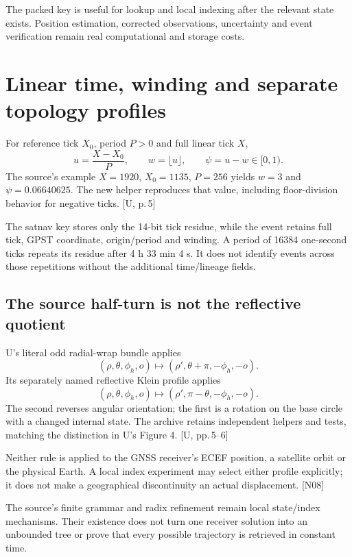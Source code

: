 \documentclass[11pt,a4paper]{article}
\newcommand{\src}[1]{\textcolor{muted}{[U, #1]}}
\newcommand{\dec}[1]{\textcolor{accent}{[N#1]}}
\begin{document}
The packed key is useful for lookup and local indexing after the relevant state exists.
Position estimation, corrected observations, uncertainty and event verification remain
real computational and storage costs.
\clearpage

\section{Linear time, winding and separate topology profiles}
For reference tick $X_0$, period $P>0$ and full linear tick $X$,
\begin{equation}
u=\frac{X-X_0}{P},\qquad w=\lfloor u\rfloor,\qquad\psi=u-w\in[0,1).
\end{equation}
The source's example $X=1920$, $X_0=1135$, $P=256$ yields $w=3$ and
$\psi=0.06640625$. The new helper reproduces that value, including floor-division
behavior for negative ticks. \src{p.\,5}

The satnav key stores only the 14-bit tick residue, while the event retains full tick,
GPST coordinate, origin/period and winding. A period of 16384 one-second ticks repeats
its residue after 4 h 33 min 4 s. It does not identify events across those repetitions
without the additional time/lineage fields.

\subsection{The source half-turn is not the reflective quotient}
U's literal odd radial-wrap bundle applies
\begin{equation}
(\rho,\theta,\phi_h,o)\mapsto(\rho',\theta+\pi,-\phi_h,-o).
\end{equation}
Its separately named reflective Klein profile applies
\begin{equation}
(\rho,\theta,\phi_h,o)\mapsto(\rho',\pi-\theta,-\phi_h,-o).
\end{equation}
The second reverses angular orientation; the first is a rotation on the base circle
with a changed internal state. The archive retains independent helpers and tests,
matching the distinction in U's Figure 4. \src{pp.\,5--6}

Neither rule is applied to the GNSS receiver's ECEF position, a satellite orbit or the
physical Earth. A local index experiment may select either profile explicitly; it does
not make a geographical discontinuity an actual displacement. \dec{08}

The source's finite grammar and radix refinement remain local state/index mechanisms.
Their existence does not turn one receiver solution into an unbounded tree or prove
that every possible trajectory is retrieved in constant time.
\clearpage
\end{document}
